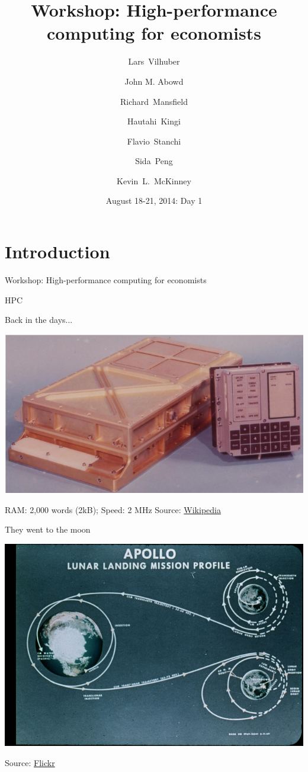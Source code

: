\documentclass[xcolor=table,compress]{beamer}
\title[Computing for Economists]{Workshop: High-performance computing for economists}
\author[Vilhuber, Abowd, Mansfield, McKinney]{%
  Lars~Vilhuber\inst{1} \and
  John M. Abowd\inst{1} \and
  Richard~Mansfield\inst{1} \and
  Hautahi~Kingi\inst{1} \and
  Flavio~Stanchi\inst{1} \and
  Sida~Peng\inst{1} \and
  Kevin~L.~McKinney %
}
\institute[Cornell]{
  \inst{1}%
   Cornell University, Economics Department,
}%
\date[August 18-21, 2014]{August 18-21, 2014: Day 1}
\begin{document}
\frame{\titlepage}


\section[Intro]{Introduction}


\begin{frame}
Workshop: High-performance computing for economists
\end{frame}


\begin{frame}{HPC}
\begin{block}{Back in the days...}
\begin{center}
\includegraphics[height=0.6\textheight]{./Agc_view}
\end{center}
\end{block}
\pause
RAM: 2,000 words (2kB); Speed: 2 MHz
\newline
\tiny Source: \href{http://upload.wikimedia.org/wikipedia/commons/7/79/Agc_view.jpg}{Wikipedia}
\end{frame}

\begin{frame}{They went to the moon}
\begin{center}
\includegraphics[height=0.7\textheight]{./apollo-11-path}
\end{center}
\tiny Source:  \href{http://farm2.staticflickr.com/1208/5105040212_346b792ee5_z.jpg}{Flickr}
\end{frame}
\end{document}
